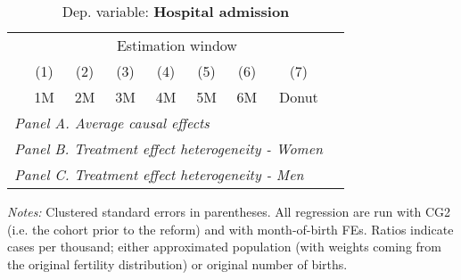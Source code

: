  \begin{table}[H] \begin{threeparttable} \centering \caption{Dep. variable: \textbf{Hospital admission}} {\def\sym#1{\ifmmode^{#1}\else\(^{#1}\)\fi} \begin{tabular}{l*{8}{c}} \toprule & \multicolumn{7}{c}{Estimation window} \\ \cmidrule(lr){2-8}
            &\multicolumn{1}{c}{(1)}&\multicolumn{1}{c}{(2)}&\multicolumn{1}{c}{(3)}&\multicolumn{1}{c}{(4)}&\multicolumn{1}{c}{(5)}&\multicolumn{1}{c}{(6)}&\multicolumn{1}{c}{(7)}\\
            &\multicolumn{1}{c}{1M}&\multicolumn{1}{c}{2M}&\multicolumn{1}{c}{3M}&\multicolumn{1}{c}{4M}&\multicolumn{1}{c}{5M}&\multicolumn{1}{c}{6M}&\multicolumn{1}{c}{Donut}\\
\midrule
 \multicolumn{8}{l}{\emph{Panel A. Average causal effects}} \\       \midrule\multicolumn{8}{l}{\emph{Panel B. Treatment effect heterogeneity - Women}} \\       \midrule\multicolumn{8}{l}{\emph{Panel C. Treatment effect heterogeneity - Men}} \\       
\bottomrule \end{tabular} } \begin{tablenotes} \item \scriptsize \emph{Notes:} Clustered standard errors in parentheses. All regression are run with CG2 (i.e. the cohort prior to the reform) and with month-of-birth FEs. Ratios indicate cases per thousand; either approximated population (with weights coming from the original fertility distribution) or original number of births. \end{tablenotes} \end{threeparttable} \end{table} 
